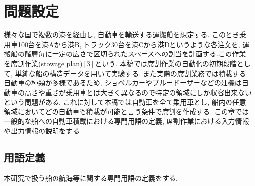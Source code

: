 \chapter{問題設定}\label{definition}

様々な国で複数の港を経由し, 自動車を輸送する運搬船を想定する. このとき乗用車100台を港Aから港B, トラック30台を港Cから港Dというような各注文を, 運搬船の階層毎に一定の広さで区切られたスペースへの割当を計画する.この作業を席割作業(stowage plan)$[3]$という. 本稿では席割作業の自動化の初期段階として, 単純な船の構造データを用いて実験する. また実際の席割業務では積載する自動車の種類が多様であるため, ショベルカーやブルードーザーなどの建機は自動車の高さや重さが乗用車とは大きく異なるので特定の領域にしか収容出来ないという問題がある. これに対して本稿では自動車を全て乗用車とし, 船内の任意領域においてどの自動車も積載が可能と言う条件で席割を作成する. この章では一般的な船への自動車積載における専門用語の定義, 席割作業における入力情報や出力情報の説明をする.

\section{用語定義}
本研究で扱う船の航海等に関する専門用語の定義をする.

